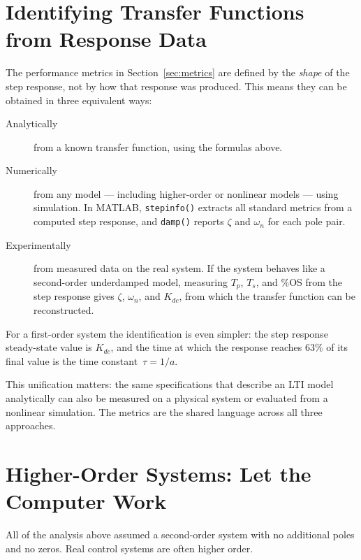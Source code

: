\documentclass[../../book.tex]{subfiles}
\begin{document}
\section{Identifying Transfer Functions from Response Data}
\label{sec:testing}

The performance metrics in Section~\ref{sec:metrics} are defined by the
\emph{shape} of the step response, not by how that response was produced.
This means they can be obtained in three equivalent ways:

\begin{description}
  \item[Analytically] from a known transfer function, using the formulas above.
  \item[Numerically] from any model --- including higher-order or nonlinear
    models --- using simulation.  In MATLAB, \texttt{stepinfo()} extracts all
    standard metrics from a computed step response, and \texttt{damp()} reports
    $\zeta$ and $\omega_n$ for each pole pair.
  \item[Experimentally] from measured data on the real system.  If the system
    behaves like a second-order underdamped model, measuring $T_p$, $T_s$, and
    \%OS from the step response gives $\zeta$, $\omega_n$, and $K_{dc}$, from
    which the transfer function can be reconstructed.
\end{description}

For a first-order system the identification is even simpler: the step response
steady-state value is $K_{dc}$, and the time at which the response reaches
$63\%$ of its final value is the time constant~$\tau = 1/a$.

This unification matters: the same specifications that describe an LTI model
analytically can also be measured on a physical system or evaluated from a
nonlinear simulation.  The metrics are the shared language across all three
approaches.

\section{Higher-Order Systems: Let the Computer Work}
\label{sec:higher}

All of the analysis above assumed a second-order system with no additional
poles and no zeros.  Real control systems are often higher order.
\end{document}
